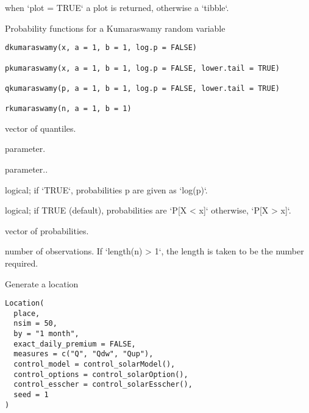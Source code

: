 \documentclass[a4paper]{book}
\begin{document}
%
\begin{Value}
when `plot = TRUE` a plot is returned, otherwise a `tibble`.
\end{Value}
%
\begin{Description}\relax
Probability functions for a Kumaraswamy random variable
\end{Description}
%
\begin{Usage}
\begin{verbatim}
dkumaraswamy(x, a = 1, b = 1, log.p = FALSE)

pkumaraswamy(x, a = 1, b = 1, log.p = FALSE, lower.tail = TRUE)

qkumaraswamy(p, a = 1, b = 1, log.p = FALSE, lower.tail = TRUE)

rkumaraswamy(n, a = 1, b = 1)
\end{verbatim}
\end{Usage}
%
\begin{Arguments}
\begin{ldescription}
\item[\code{x}] vector of quantiles.

\item[\code{a}] parameter.

\item[\code{b}] parameter..

\item[\code{log.p}] logical; if `TRUE`, probabilities p are given as `log(p)`.

\item[\code{lower.tail}] logical; if TRUE (default), probabilities are `P[X < x]` otherwise, `P[X > x]`.

\item[\code{p}] vector of probabilities.

\item[\code{n}] number of observations. If `length(n) > 1`, the length is taken to be the number required.
\end{ldescription}
\end{Arguments}
%
\begin{Description}\relax
Generate a location
\end{Description}
%
\begin{Usage}
\begin{verbatim}
Location(
  place,
  nsim = 50,
  by = "1 month",
  exact_daily_premium = FALSE,
  measures = c("Q", "Qdw", "Qup"),
  control_model = control_solarModel(),
  control_options = control_solarOption(),
  control_esscher = control_solarEsscher(),
  seed = 1
)
\end{verbatim}
\end{Usage}
\end{document}

